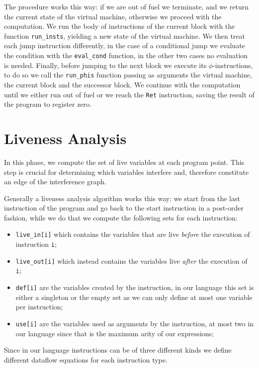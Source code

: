 The procedure works this way: if we are out of fuel we terminate, and we return the current state of the virtual machine, otherwise we proceed with the computation.
We run the body of instructions of the current block with the function \texttt{run\_insts}, yielding a new state of the virtual machine. We then treat each jump instruction differently, in the case of a conditional jump we evaluate the condition with the \texttt{eval\_cond} function, in the other two cases no evaluation is needed. Finally, before jumping to the next block we execute its $\phi$-instructions, to do so we call the \texttt{run\_phis} function passing as arguments the virtual machine, the current block and the successor block.
We continue with the computation until we either run out of fuel or we reach the \texttt{Ret} instruction, saving the result of the program to register zero.

\section{Liveness Analysis}
\label{sec:liveness}

In this phase, we compute the set of live variables at each program point. This step is crucial for determining which variables interfere and, therefore constitute an edge of the interference graph.

Generally a liveness analysis algorithm works this way:
we start from the last instruction of the program and go back to the start instruction in a post-order fashion, while we do that we compute the following sets for each instruction:
\begin{itemize}
  \item \texttt{live\_in[i]} which contains the variables that are live \textit{before} the execution of instruction \texttt i;
  \item \texttt{live\_out[i]} which instead contains the variables live \textit{after} the execution of \texttt i;
  \item \texttt{def[i]} are the variables created by the instruction, in our language this set is either a singleton or the empty set as we can only define at most one variable per instruction;
  \item \texttt{use[i]} are the variables used as arguments by the instruction, at most two in our language since that is the maximum arity of our expressions;
\end{itemize}

Since in our language instructions can be of three different kinds we define different dataflow equations for each instruction type.

